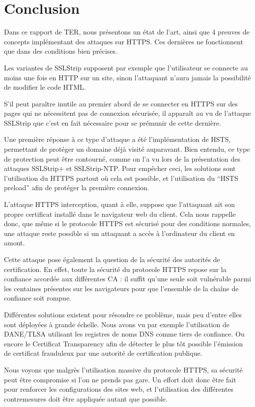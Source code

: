 \chapter*{Conclusion}


Dans ce rapport de TER, nous présentons un état de l'art, ainsi que 4 preuves de concepts implémentant des attaques sur HTTPS. Ces dernières ne fonctionnent que dans des conditions bien précises.

Les variantes de SSLStrip supposent par exemple que l'utilisateur se connecte au moins une fois en HTTP sur un site, sinon l'attaquant n'aura jamais la possibilité de modifier le code HTML.

S'il peut paraître inutile au premier abord de se connecter en HTTPS sur des pages qui ne nécessitent pas de connexion sécurisée, il apparaît au vu de l'attaque SSLStrip que c'est en fait nécessaire pour se prémunir de cette dernière.

Une première réponse à ce type d'attaque a été l'implémentation de HSTS, permettant de protéger un domaine déjà visité auparavant. Bien entendu, ce type de protection peut être contourné, comme on l'a vu lors de la présentation des attaques SSLStrip+ et SSLStrip-NTP. Pour empêcher ceci, les solutions sont l'utilisation du HTTPS partout où cela est possible, et l'utilisation du ``HSTS preload'' afin de protéger la première connexion.

L'attaque HTTPS interception, quant à elle, suppose que l'attaquant ait son propre certificat installé dans le navigateur web du client. Cela nous rappelle donc, que même si le protocole HTTPS est sécurisé pour des conditions normales, une attaque reste possible si un attaquant a accès à l'ordinateur du client en amont.

Cette attaque pose également la question de la sécurité des autorités de certification. En effet, toute la sécurité du protocole HTTPS repose sur la confiance accordée aux différentes CA : il suffit qu'une seule soit vulnérable parmi les centaines présentes sur les navigateurs pour que l'ensemble de la chaîne de confiance soit rompue.

Différentes solutions existent pour résoudre ce problème, mais peu d'entre elles sont déployées à grande échelle. Nous avons vu par exemple l'utilisation de DANE/TLSA utilisant les registres de noms DNS comme tiers de confiance. Ou encore le Certificat Transparency afin de détecter le plus tôt possible l'émission de certificat frauduleux par une autorité de certification publique.

Nous voyons que malgrès l'utilisation massive du protocole HTTPS, sa sécurité peut être compromise si l'on ne prends pas gare. Un effort doit donc être fait pour renforcer les configurations des sites web, et l'utilisation des différentes contremesures doit être appliquée autant que possible.
